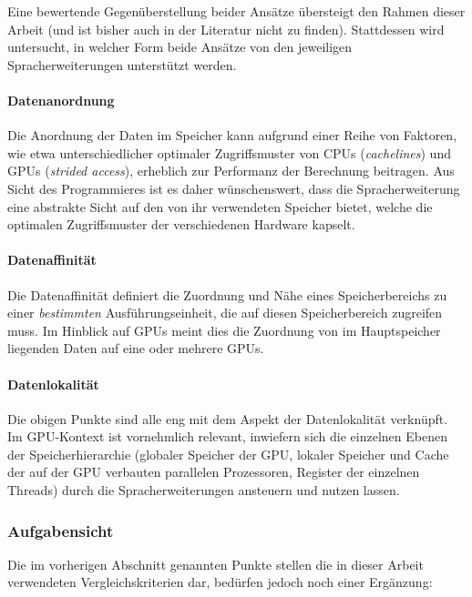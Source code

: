 Eine bewertende Gegenüberstellung beider Ansätze übersteigt den Rahmen dieser
Arbeit (und ist bisher auch in der Literatur nicht zu finden). Stattdessen wird
untersucht, in welcher Form beide Ansätze von den jeweiligen Spracherweiterungen
unterstützt werden.

\paragraph{Datenanordnung}

Die Anordnung der Daten im Speicher kann aufgrund einer Reihe von Faktoren, wie
etwa unterschiedlicher optimaler Zugriffsmuster von CPUs (\textit{cachelines})
und GPUs (\textit{strided access}), erheblich zur Performanz der Berechnung
beitragen. Aus Sicht des Programmieres ist es daher wünschenswert, dass die
Spracherweiterung eine abstrakte Sicht auf den von ihr verwendeten Speicher
bietet, welche die optimalen Zugriffsmuster der verschiedenen Hardware kapselt.

\paragraph{Datenaffinität}

Die Datenaffinität definiert die Zuordnung und Nähe eines Speicherbereichs zu
einer \textit{bestimmten} Ausführungseinheit, die auf diesen Speicherbereich
zugreifen muss. Im Hinblick auf GPUs meint dies die Zuordnung von im
Hauptspeicher liegenden Daten auf eine oder mehrere GPUs.

\paragraph{Datenlokalität}

Die obigen Punkte sind alle eng mit dem Aspekt der Datenlokalität verknüpft.
Im GPU-Kontext ist vornehmlich relevant, inwiefern sich die einzelnen
Ebenen der Speicherhierarchie (globaler Speicher der GPU, lokaler Speicher und
Cache der auf der GPU verbauten parallelen Prozessoren, Register der einzelnen
Threads) durch die Spracherweiterungen ansteuern und nutzen lassen.

\subsubsection{Aufgabensicht}
\label{vergleich:anforderungen:aufgabensicht}

Die im vorherigen Abschnitt genannten Punkte stellen die in dieser Arbeit
verwendeten Vergleichskriterien dar, bedürfen jedoch noch einer Ergänzung:

